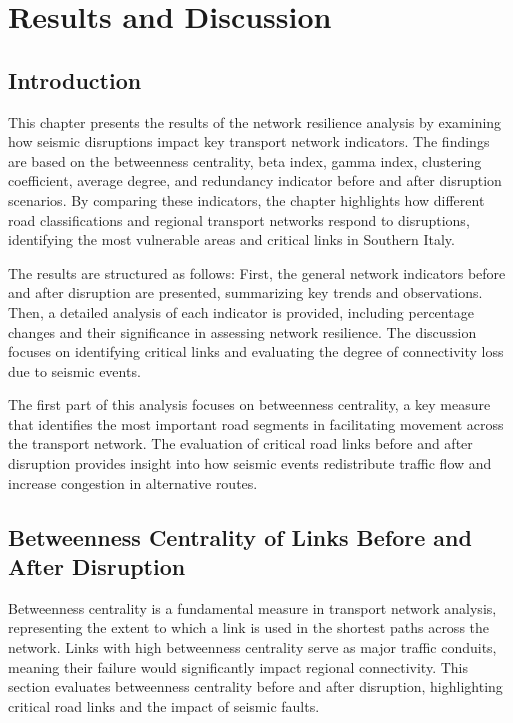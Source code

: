 \chapter{Results and Discussion}

\section{Introduction}
This chapter presents the results of the network resilience analysis by examining how seismic disruptions impact key transport network indicators. The findings are based on the betweenness centrality, beta index, gamma index, clustering coefficient, average degree, and redundancy indicator before and after disruption scenarios. By comparing these indicators, the chapter highlights how different road classifications and regional transport networks respond to disruptions, identifying the most vulnerable areas and critical links in Southern Italy.

The results are structured as follows: First, the general network indicators before and after disruption are presented, summarizing key trends and observations. Then, a detailed analysis of each indicator is provided, including percentage changes and their significance in assessing network resilience. The discussion focuses on identifying critical links and evaluating the degree of connectivity loss due to seismic events.

The first part of this analysis focuses on betweenness centrality, a key measure that identifies the most important road segments in facilitating movement across the transport network. The evaluation of critical road links before and after disruption provides insight into how seismic events redistribute traffic flow and increase congestion in alternative routes.

\section{Betweenness Centrality of Links Before and After Disruption}
Betweenness centrality is a fundamental measure in transport network analysis, representing the extent to which a link is used in the shortest paths across the network. Links with high betweenness centrality serve as major traffic conduits, meaning their failure would significantly impact regional connectivity. This section evaluates betweenness centrality before and after disruption, highlighting critical road links and the impact of seismic faults.

